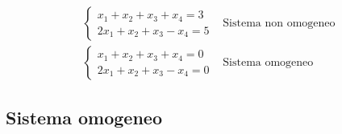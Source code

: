 \begin{eqnarray*}
  \begin{cases}
    x_1+x_2+x_3+x_4=3\\
    2x_1+x_2+x_3-x_4=5
  \end{cases} & \text{Sistema non omogeneo}\\
  \begin{cases}
     x_1+x_2+x_3+x_4=0\\
    2x_1+x_2+x_3-x_4=0   
  \end{cases} & \text{Sistema omogeneo}
\end{eqnarray*}
\clearpage
\subsection{Sistema omogeneo}
\label{sec:sistemaomogeneo}

